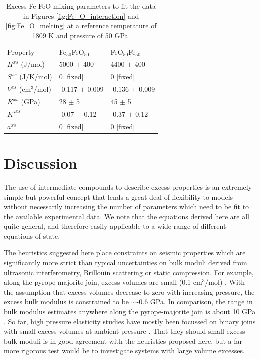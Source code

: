 \documentclass[review]{elsarticle}
\begin{document}
\begin{table}[ht!]
\centering
\caption{Excess Fe-FeO mixing parameters to fit the data in Figures \ref{fig:Fe_O_interaction} and \ref{fig:Fe_O_melting} at a reference temperature of 1809 K and pressure of 50 GPa.}
\label{tab:Fe_FeO}
\begin{tabular}{lll}
  Property        & Fe$_{50}$FeO$_{50}$  & FeO$_{50}$Fe$_{50}$ \\
  $H^{xs}$ (J/mol) &  5000 $\pm$ 400 & 4400 $\pm$ 400  \\
  $S^{xs}$ (J/K/mol)  & 0 [fixed] & 0 [fixed] \\
  $V^{xs}$ (cm$^3$/mol)   & -0.117 $\pm$ 0.009 &  -0.136 $\pm$ 0.009 \\
  $K^{xs}$  (GPa)  & 28 $\pm$ 5 & 45 $\pm$ 5  \\
  $K'^{xs}$   & -0.07 $\pm$ 0.12 & -0.37 $\pm$ 0.12  \\
  $a^{xs}$   & 0 [fixed] & 0 [fixed]  
\end{tabular}
\end{table}

\clearpage
\section{Discussion}

The use of intermediate compounds to describe excess properties is an extremely simple but powerful concept that lends a great deal of flexibility to models without necessarily increasing the number of parameters which need to be fit to the available experimental data. We note that the equations derived here are all quite general, and therefore easily applicable to a wide range of different equations of state.

The heuristics suggested here place constraints on seismic properties which are significantly more strict than typical uncertainties on bulk moduli derived from ultrasonic interferometry, Brillouin scattering or static compression. For example, along the pyrope-majorite join, excess volumes are small (0.1 cm$^3$/mol) \citep{HSSR1997}. With the assumption that excess volumes decrease to zero with increasing pressure, the excess bulk modulus is constrained to be $\sim$-0.6 GPa. In comparison, the range in bulk modulus estimates anywhere along the pyrope-majorite join is about 10 GPa \citep[see, for example][]{HDWB2010}. So far, high pressure elasticity studies have mostly been focussed on binary joins with small excess volumes at ambient pressure \citep{FXMLX2015, HC2014}. That they should small excess bulk moduli is in good agreement with the heuristics proposed here, but a far more rigorous test would be to investigate systems with large volume excesses.
\end{document}
